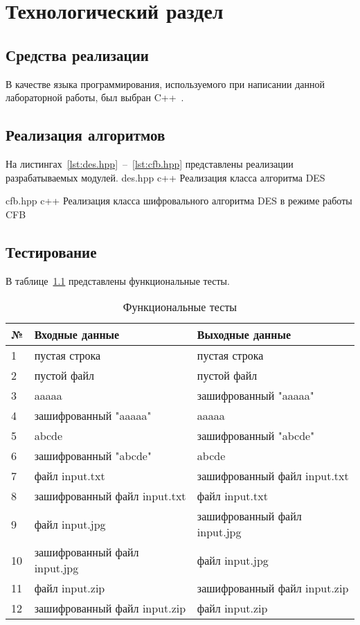 \chapter{Технологический раздел}

\section{Средства реализации}
В качестве языка программирования, используемого при написании данной лабораторной работы, был выбран C++~\cite{cpp-lang}.
	
\section{Реализация алгоритмов}
На листингах~\ref{lst:des.hpp}~--~\ref{lst:cfb.hpp} представлены реализации разрабатываемых модулей.
	{des.hpp}
	{c++}
	{Реализация класса алгоритма DES}

	{cfb.hpp}
	{c++}
	{Реализация класса шифровального алгоритма DES в режиме работы CFB}

\section{Тестирование}
В таблице~\ref{tbl:functional_test} представлены функциональные тесты.
\begin{table}[ht!]
	\begin{center}
		\captionsetup{justification=raggedright,singlelinecheck=off}
		\caption{\label{tbl:functional_test} Функциональные тесты}
		\begin{tabular}{|m{1em}|m{15em}|m{15em}|}
			\hline
			№ & Входные данные & Выходные данные \\ 
			\hline
			1 & пустая строка & пустая строка \\
			\hline
			2 & пустой файл & пустой файл \\
			\hline
			3 & aaaaa & зашифрованный "aaaaa" \\
			\hline
			4 & зашифрованный "aaaaa" & aaaaa \\
			\hline
			5 & abcde & зашифрованный "abcde" \\
			\hline
			6 & зашифрованный "abcde" & abcde \\
			\hline
			7 & файл input.txt & зашифрованный файл input.txt \\
			\hline
			8 & зашифрованный файл input.txt & файл input.txt \\
			\hline
			9 & файл input.jpg & зашифрованный файл input.jpg \\
			\hline
			10 & зашифрованный файл input.jpg & файл input.jpg \\
			\hline
			11 & файл input.zip & зашифрованный файл input.zip \\
			\hline
			12 & зашифрованный файл input.zip & файл input.zip \\
			\hline
		\end{tabular}
	\end{center}
\end{table}
